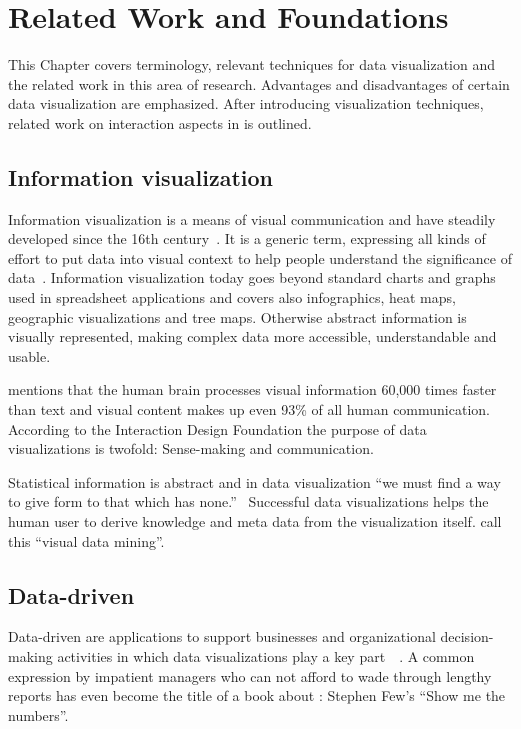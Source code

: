 \chapter{Related Work and Foundations}\label{sec:related-work}

This Chapter covers terminology, relevant techniques for data visualization and the related work in this area of research.
Advantages and disadvantages of certain data visualization are emphasized.
After introducing visualization techniques, related work on interaction aspects in \cmvs{} is outlined.


\section{Information visualization}
Information visualization is a means of visual communication and have steadily developed since the 16th century~\parencite{Friendly2001}.
It is a generic term, expressing all kinds of effort to put data into visual context to help people understand the significance of data~\parencite{Rose2017}.
Information visualization today goes beyond standard charts and graphs used in spreadsheet applications and covers also infographics, heat maps, geographic visualizations and tree maps.
Otherwise abstract information is visually represented, making complex data more accessible, understandable and usable.

\textcite{Kusinitz2014} mentions that the human brain processes visual information 60,000 times faster than text and visual content makes up even 93\% of all human communication.
According to the Interaction Design Foundation the purpose of data visualizations is twofold:
Sense-making and communication.

Statistical information is abstract and in data visualization ``we must find a way to give form to that which has none.''~\parencite{Few2013}
Successful data visualizations helps the human user to derive knowledge and meta data from the visualization itself.
\textcite{Nocke2002} call this ``visual data mining''.

\section{Data-driven \dss{}}
Data-driven \dss{} are applications to support businesses and organizational decision-making activities in which data visualizations play a key part~\parencite{Nada2007}~\parencite{Poleto2015}.
A common expression by impatient managers who can not afford to wade through lengthy reports has even become the title of a book about \dss{}:
Stephen Few's ``Show me the numbers''.

